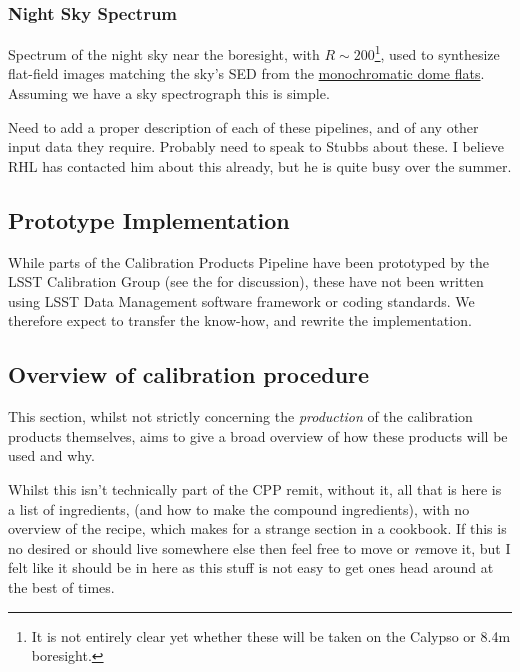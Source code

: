  
\subsubsection{Night Sky Spectrum}\label{sec:CPP:aux:nightSkySpectrum}
Spectrum of the night sky near the \auxtelescope boresight, with $R \sim 200$\footnote{It is not entirely clear yet whether these will be taken on the Calypso or 8.4m boresight.}, used to synthesize flat-field images matching the sky's SED from the \hyperref[sec:CPP:output:monoFlat]{monochromatic dome flats}.
\alg Assuming we have a sky spectrograph this is simple.

\begin{note}
	Need to add a proper description of each of these pipelines, and of any other input data they require. Probably need to speak to Stubbs about these. I believe RHL has contacted him about this already, but he is quite busy over the summer.
\end{note}




\subsection{Prototype Implementation}
\label{sec:CPP:prototypeImplementation}
While parts of the Calibration Products Pipeline have been prototyped by the LSST Calibration Group (see the \NewPCP for discussion), these have not been written using LSST Data Management software framework or coding standards. We therefore expect to transfer the know-how, and rewrite the implementation.












\subsection{Overview of calibration procedure}
This section, whilst not strictly concerning the \emph{production} of the calibration products themselves, aims to give a broad overview of how these products will be used and why. 
\begin{note}
Whilst this isn't technically part of the CPP remit, without it, all that is here is a list of ingredients, (and how to make the compound ingredients), with no overview of the recipe, which makes for a strange section in a cookbook. If this is no desired or should live somewhere else then feel free to move or \emph{re}move it, but I felt like it should be in here as this stuff is not easy to get ones head around at the best of times.
\end{note}

